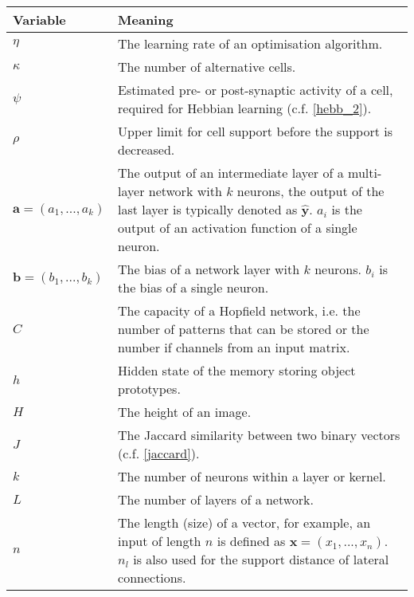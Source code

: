\begin{tabular}{ p{3cm} p{11cm} }
	\textbf{Variable} & \textbf{Meaning}\\
	\hline
	$\eta$ & The learning rate of an optimisation algorithm.\\
    $\kappa$ & The number of alternative cells.\\
    $\psi$ & Estimated pre- or post-synaptic activity of a cell, required for Hebbian learning (c.f. \eqref{hebb_2}).\\
    $\rho$ & Upper limit for cell support before the support is decreased.\\
	$\boldsymbol{a} = (a_1, ..., a_k)$ & The output of an intermediate layer of a multi-layer network with $k$ neurons, the output of the last layer is typically denoted as $\boldsymbol{\hat{y}}$. $a_i$ is the output of an activation function of a single neuron.\\
	$\boldsymbol{b} = (b_1, ..., b_k)$ & The bias of a network layer with 
    $k$ neurons. $b_i$ is the bias of a single neuron.\\
    $C$ & The capacity of a Hopfield network, i.e. the number of patterns that can be stored or the number if channels from an input matrix.\\
    $h$ & Hidden state of the memory storing object prototypes.\\
    $H$ & The height of an image.\\
    $J$ & The Jaccard similarity between two binary vectors (c.f. \eqref{jaccard}).\\
    $k$ & The number of neurons within a layer or kernel.\\
    $L$ & The number of layers of a network.\\
    $n$ & The length (size) of a vector, for example, an input of length $n$ is defined as $\boldsymbol{x} = (x_1, ..., x_n)$. $n_l$ is also used for the support distance of lateral connections.\\


 \end{tabular}
 
